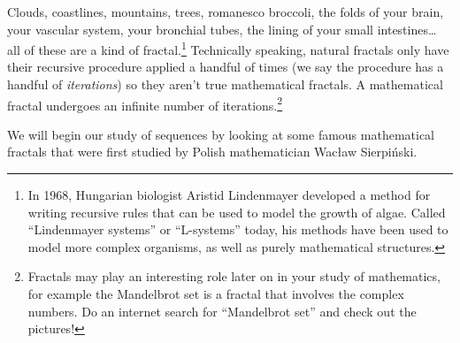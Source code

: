 Clouds, coastlines, mountains, trees, romanesco broccoli, the folds of your brain, your vascular system, your bronchial tubes, the lining of your small intestines\ldots{} all of these are a kind of fractal.\footnote{In 1968, Hungarian biologist Aristid Lindenmayer developed a method for writing recursive rules that can be used to model the growth of algae. Called ``Lindenmayer systems'' or ``L-systems'' today, his methods have been used to model more complex organisms, as well as purely mathematical structures.} Technically speaking, natural fractals only have their recursive procedure applied a handful of times (we say the procedure has a handful of \textit{iterations}) so they aren't true mathematical fractals. A mathematical fractal undergoes an infinite number of iterations.\footnote{Fractals may play an interesting role later on in your study of mathematics, for example the Mandelbrot set is a fractal that involves the complex numbers. Do an internet search for ``Mandelbrot set'' and check out the pictures!}

We will begin our study of sequences by looking at some famous mathematical fractals that were first studied by Polish mathematician Wac{\l}aw Sierpi\'nski.

\begin{boxedexplore}
\end{boxedexplore}

